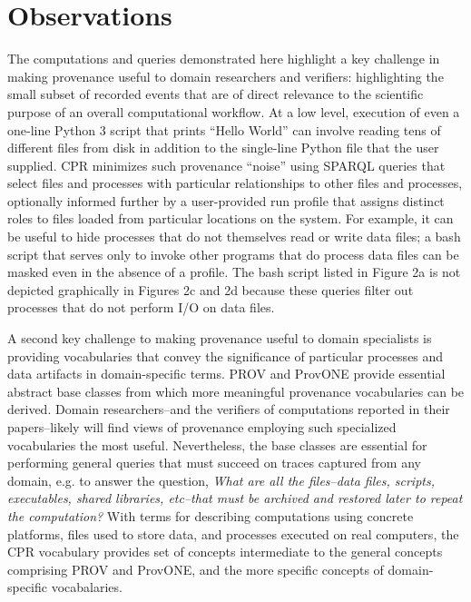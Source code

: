 \section{Observations}

The computations and queries demonstrated here highlight a key challenge in making provenance useful to domain researchers and verifiers: highlighting the small subset of recorded events that are of direct relevance to the scientific purpose of an overall computational workflow. At a low level, execution of even a one-line Python 3 script that prints ``Hello World'' can involve reading tens of different files from disk in addition to the single-line Python file that the user supplied. CPR minimizes such provenance ``noise'' using SPARQL queries that select files and processes with particular relationships to other files and processes, optionally informed further by a user-provided run profile that assigns distinct roles to files loaded from particular locations on the system.  For example, it can be useful to hide processes that do not themselves read or write data files; a bash script that serves only to invoke other programs that do process data files can be masked even in the absence of a profile. The bash script listed in Figure 2a is not depicted graphically in Figures 2c and 2d because these queries filter out processes that do not perform I/O on data files.

A second key challenge to making provenance useful to domain specialists is providing vocabularies that convey the significance of particular processes and data artifacts in domain-specific terms. PROV and ProvONE provide essential abstract base classes from which more meaningful provenance vocabularies can be derived.  Domain researchers--and the verifiers of computations reported in their papers--likely will find views of provenance employing such specialized vocabularies the most useful. Nevertheless, the base classes are essential for performing general queries that must succeed on traces captured from any domain, e.g. to answer the question, \emph{What are all the files--data files, scripts, executables, shared libraries, etc--that must be archived and restored later to repeat the computation?} With terms for describing computations using concrete platforms, files used to store data, and processes executed on real computers, the CPR vocabulary provides set of concepts intermediate to the general concepts comprising PROV and ProvONE, and the more specific concepts of domain-specific vocabalaries. 


